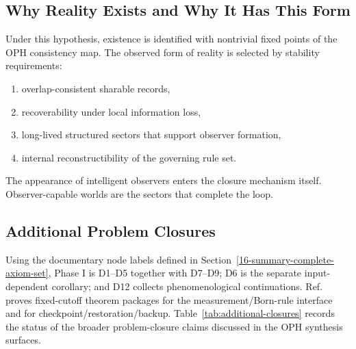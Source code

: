 \subsection{Why Reality Exists and Why It Has This Form}

Under this hypothesis, existence is identified with nontrivial fixed points of the OPH
consistency map. The observed form of reality is selected by stability requirements:
\begin{enumerate}
\item overlap-consistent sharable records,
\item recoverability under local information loss,
\item long-lived structured sectors that support observer formation,
\item internal reconstructibility of the governing rule set.
\end{enumerate}
The appearance of intelligent observers enters the closure mechanism itself. Observer-capable
worlds are the sectors that complete the loop.

\subsection{Additional Problem Closures}

Using the documentary node labels defined in Section~\ref{16-summary-complete-axiom-set}, Phase I
is D1--D5 together with D7--D9; D6 is the separate input-dependent corollary; and D12
collects phenomenological continuations. Ref.~\cite{ophmicrophysics} proves fixed-cutoff theorem
packages for the measurement/Born-rule interface and for checkpoint/restoration/backup.
Table~\ref{tab:additional-closures} records the status of the broader problem-closure claims
discussed in the OPH synthesis surfaces.

